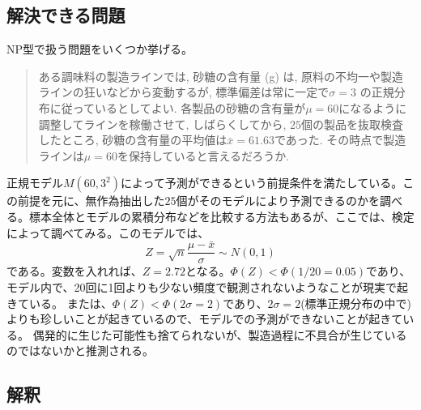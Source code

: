 \subsection{解決できる問題}
NP型で扱う問題をいくつか挙げる。
\begin{quote}
    ある調味料の製造ラインでは, 砂糖の含有量 (g) は, 原料の不均一や製造ラインの狂いなどから変動するが, 標準偏差は常に一定で$\sigma=3$ の正規分布に従っているとしてよい. 各製品の砂糖の含有量が$\mu=60$になるように調整してラインを稼働させて, しばらくしてから, $25$個の製品を抜取検査したところ, 砂糖の含有量の平均値は$\bar{x}=61.63$であった. その時点で製造ラインは$\mu=60$を保持していると言えるだろうか.

\end{quote}
正規モデル$M(60,3^2)$によって予測ができるという前提条件を満たしている。この前提を元に、無作為抽出した$25$個がそのモデルにより予測できるのかを調べる。標本全体とモデルの累積分布などを比較する方法もあるが、ここでは、検定によって調べてみる。このモデルでは、
\begin{equation*}
    Z=\sqrt{n}\frac{\mu-\bar{x}}{\sigma} \sim N(0,1)
\end{equation*}
である。変数を入れれば、$Z=2.72$となる。$\varPhi(Z)<\varPhi(1/20=0.05)$であり、モデル内で、20回に1回よりも少ない頻度で観測されないようなことが現実で起きている。
または、$\varPhi(Z)<\varPhi(2\sigma=2)$であり、$2\sigma=2$(標準正規分布の中で)よりも珍しいことが起きているので、モデルでの予測ができないことが起きている。
偶発的に生じた可能性も捨てられないが、製造過程に不具合が生じているのではないかと推測される。



\subsection{解釈}



